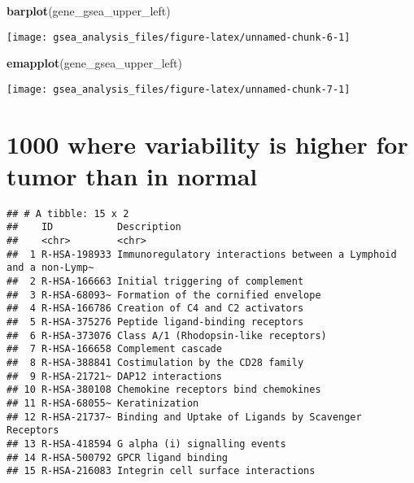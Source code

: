 \documentclass[
]{article}
\newenvironment{Shaded}{\begin{snugshade}}{\end{snugshade}}
\newcommand{\KeywordTok}[1]{\textcolor[rgb]{0.13,0.29,0.53}{\textbf{#1}}}
\newcommand{\NormalTok}[1]{#1}
\newcommand{\OperatorTok}[1]{\textcolor[rgb]{0.81,0.36,0.00}{\textbf{#1}}}
\newcommand{\StringTok}[1]{\textcolor[rgb]{0.31,0.60,0.02}{#1}}
\begin{document}
\begin{Shaded}
\begin{Highlighting}[]
\KeywordTok{barplot}\NormalTok{(gene_gsea_upper_left)}
\end{Highlighting}
\end{Shaded}

\texttt{[image: gsea\_analysis\_files/figure-latex/unnamed-chunk-6-1]}

\begin{Shaded}
\begin{Highlighting}[]
\KeywordTok{emapplot}\NormalTok{(gene_gsea_upper_left)}
\end{Highlighting}
\end{Shaded}

\texttt{[image: gsea\_analysis\_files/figure-latex/unnamed-chunk-7-1]}

\hypertarget{where-variability-is-higher-for-tumor-than-in-normal}{%
\section{1000 where variability is higher for tumor than in
normal}\label{where-variability-is-higher-for-tumor-than-in-normal}}

\begin{Shaded}
\end{Shaded}

\begin{verbatim}
## # A tibble: 15 x 2
##    ID           Description                                                     
##    <chr>        <chr>                                                           
##  1 R-HSA-198933 Immunoregulatory interactions between a Lymphoid and a non-Lymp~
##  2 R-HSA-166663 Initial triggering of complement                                
##  3 R-HSA-68093~ Formation of the cornified envelope                             
##  4 R-HSA-166786 Creation of C4 and C2 activators                                
##  5 R-HSA-375276 Peptide ligand-binding receptors                                
##  6 R-HSA-373076 Class A/1 (Rhodopsin-like receptors)                            
##  7 R-HSA-166658 Complement cascade                                              
##  8 R-HSA-388841 Costimulation by the CD28 family                                
##  9 R-HSA-21721~ DAP12 interactions                                              
## 10 R-HSA-380108 Chemokine receptors bind chemokines                             
## 11 R-HSA-68055~ Keratinization                                                  
## 12 R-HSA-21737~ Binding and Uptake of Ligands by Scavenger Receptors            
## 13 R-HSA-418594 G alpha (i) signalling events                                   
## 14 R-HSA-500792 GPCR ligand binding                                             
## 15 R-HSA-216083 Integrin cell surface interactions
\end{verbatim}
\end{document}
